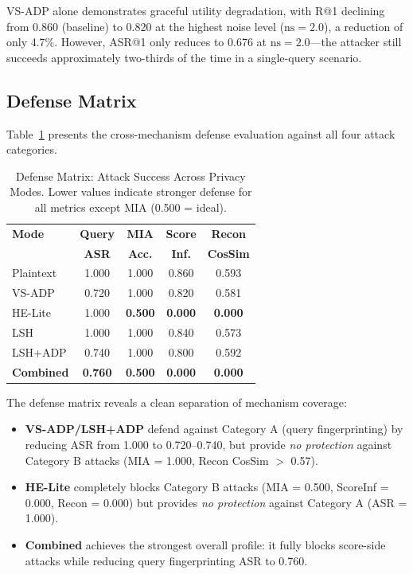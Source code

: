 \documentclass[conference]{IEEEtran}
\begin{document}
VS-ADP alone demonstrates graceful utility degradation, with R@1 declining from 0.860 (baseline) to 0.820 at the highest noise level ($\text{ns}=2.0$), a reduction of only 4.7\%. However, ASR@1 only reduces to 0.676 at $\text{ns}=2.0$---the attacker still succeeds approximately two-thirds of the time in a single-query scenario.

\subsection{Defense Matrix}

Table~\ref{tab:defense_matrix} presents the cross-mechanism defense evaluation against all four attack categories.

\begin{table}[t]
\centering
\caption{Defense Matrix: Attack Success Across Privacy Modes. Lower values indicate stronger defense for all metrics except MIA (0.500 = ideal).}
\label{tab:defense_matrix}
\begin{tabular}{@{}lcccc@{}}
\toprule
\textbf{Mode} & \textbf{Query} & \textbf{MIA} & \textbf{Score} & \textbf{Recon} \\
 & \textbf{ASR} & \textbf{Acc.} & \textbf{Inf.} & \textbf{CosSim} \\
\midrule
Plaintext & 1.000 & 1.000 & 0.860 & 0.593 \\
VS-ADP & 0.720 & 1.000 & 0.820 & 0.581 \\
HE-Lite & 1.000 & \textbf{0.500} & \textbf{0.000} & \textbf{0.000} \\
LSH & 1.000 & 1.000 & 0.840 & 0.573 \\
LSH+ADP & 0.740 & 1.000 & 0.800 & 0.592 \\
\textbf{Combined} & \textbf{0.760} & \textbf{0.500} & \textbf{0.000} & \textbf{0.000} \\
\bottomrule
\end{tabular}
\end{table}

The defense matrix reveals a clean separation of mechanism coverage:

\begin{itemize}
    \item \textbf{VS-ADP/LSH+ADP} defend against Category A (query fingerprinting) by reducing ASR from 1.000 to 0.720--0.740, but provide \textit{no protection} against Category B attacks (MIA = 1.000, Recon CosSim $>$ 0.57).
    
    \item \textbf{HE-Lite} completely blocks Category B attacks (MIA = 0.500, ScoreInf = 0.000, Recon = 0.000) but provides \textit{no protection} against Category A (ASR = 1.000).
    
    \item \textbf{Combined} achieves the strongest overall profile: it fully blocks score-side attacks while reducing query fingerprinting ASR to 0.760.
\end{itemize}
\end{document}
